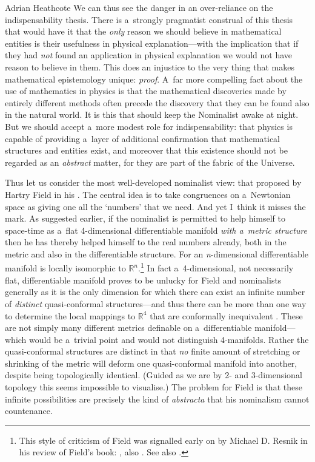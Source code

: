 \begin{artengenv}{Adrian Heathcote}
We can thus see the danger in an over-reliance on the indispensability thesis. There is a~strongly pragmatist construal of this thesis that would have it that the \textit{only} reason we should believe in mathematical entities is their usefulness in physical explanation---with the implication that if they had \textit{not} found an application in physical explanation we would not have reason to believe in them. This does an injustice to the very thing that makes mathematical epistemology unique: \textit{proof}. A~far more compelling fact about the use of mathematics in physics is that the mathematical discoveries made by entirely different methods often precede the discovery that they can be found also in the natural world. It is this that should keep the Nominalist awake at night. But we should accept a~more modest role for indispensability: that physics is capable of providing a~layer of additional confirmation that mathematical structures and entities exist, and moreover that this existence should not be regarded as an \textit{abstract} matter, for they are part of the fabric of the Universe.

Thus let us consider the most well-developed nominalist view: that proposed by Hartry Field in his \parencite*{field_science_1980}. The central idea is to take congruences on a~Newtonian space as giving one all the `numbers' that we need. And yet I~think it misses the mark. As suggested earlier, if the nominalist is permitted to help himself to space-time as a~flat 4-dimensional differentiable manifold \textit{with a~metric structure} then he has thereby helped himself to the real numbers already, both in the metric and also in the differentiable structure. For an \textit{n}-dimensional differentiable manifold is locally isomorphic to $\mathbb{R}^{n}$.\footnote{This style of criticism of Field was signalled early on by Michael D. Resnik in his review of Field's book: \parencite{resnik_hartry_1983}, also \parencite{resnik_how_1985}. See also \parencite{steiner_applicability_1998}.} In fact a~4-dimensional, not necessarily flat, differentiable manifold proves to be unlucky for Field and nominalists generally as it is the only dimension for which there can exist an infinite number of \textit{distinct} quasi-conformal structures---and thus there can be more than one way to determine the local mappings to $\mathbb{R}^{4}$ that are conformally inequivalent \parencite{donaldson_quasiconformal_1989}. These are not simply many different metrics definable on a~differentiable manifold---which would be a~trivial point and would not distinguish 4-manifolds. Rather the quasi-conformal structures are distinct in that \textit{no} finite amount of stretching or shrinking of the metric will deform one quasi-conformal manifold into another, despite being topologically identical. (Guided as we are by 2- and 3-dimensional topology this seems impossible to visualise.) The problem for Field is that these infinite possibilities are precisely the kind of \textit{abstracta} that his nominalism cannot countenance.


\end{artengenv}
